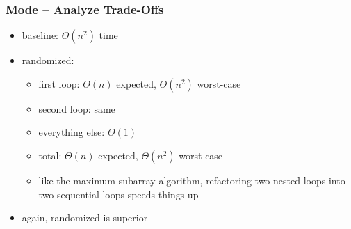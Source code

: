 \documentclass[10pt,aspectratio=169]{beamer}
\begin{document}
\begin{frame} \frametitle{Mode -- Analyze Trade-Offs}
  \begin{itemize}
    \item baseline: $\Theta(n^2)$ time
    \item randomized:
      \begin{itemize}
        \item first loop: $\Theta(n)$ expected, $\Theta(n^2)$ worst-case
        \item second loop: same
        \item everything else: $\Theta(1)$
        \item total: $\Theta(n)$ expected, $\Theta(n^2)$ worst-case
        \item like the maximum subarray algorithm, refactoring two nested loops into two sequential loops speeds things up
      \end{itemize}
    \item again, randomized is superior
  \end{itemize}
\end{frame}
\end{document}
